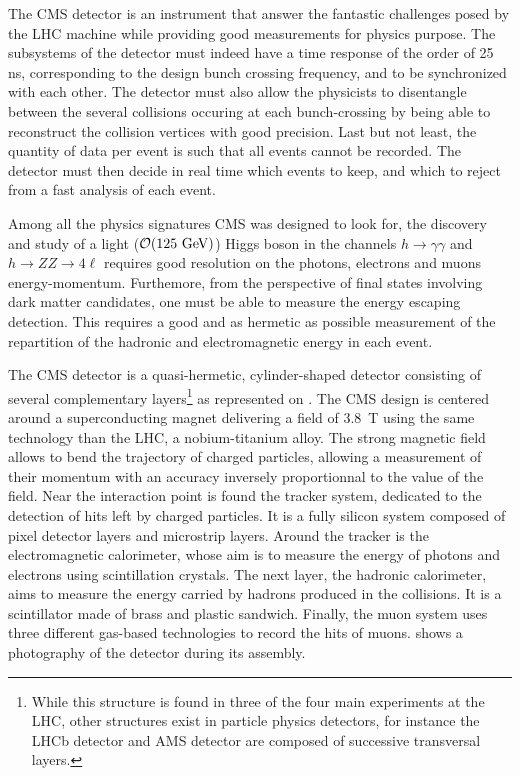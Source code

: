         The CMS detector \cite{CMSdetector} is an instrument that answer the fantastic challenges posed by
        the LHC machine while providing good measurements for physics purpose.
        The subsystems of the detector must indeed have a time response of the order of 25 ns,
        corresponding to the design bunch crossing frequency, and to be synchronized with
        each other. The detector must also allow the physicists to disentangle between the
        several collisions occuring at each bunch-crossing by being able to
        reconstruct the collision vertices with good precision. Last but not least,
        the quantity of data per event is such that all events cannot be recorded. The
        detector must then decide in real time which events to keep, and which to reject
        from a fast analysis of each event.

        Among all the physics signatures CMS was designed to look for, the discovery and study of a
        light ($\mathcal{O}(125 ~\text{GeV})$) Higgs boson in the channels $h\rightarrow\gamma\gamma$
        and $h\rightarrow ZZ \rightarrow 4\ell$ requires good resolution on the photons,
        electrons and muons energy-momentum. Furthemore, from the perspective of final
        states involving dark matter candidates, one must be able to measure
        the energy escaping detection. This requires a good and as hermetic as
        possible measurement of the repartition of the hadronic and electromagnetic energy
        in each event.


        The CMS detector is a quasi-hermetic, cylinder-shaped detector consisting of
        several complementary layers\footnote{While this structure is found in three of the four
        main experiments at the LHC, other structures exist in particle physics detectors,
        for instance the LHCb detector and AMS detector are composed of successive
        transversal layers.}
        as represented on .
        The CMS design is centered around a superconducting magnet delivering a field of
        3.8~T using the same technology than the LHC, a nobium-titanium alloy. The strong
        magnetic field allows to bend the trajectory of charged particles, allowing a
        measurement of their momentum with an accuracy inversely proportionnal to the value
        of the field.
        Near the interaction point is found the tracker system, dedicated to
        the detection of hits left by charged particles. It is a fully silicon system composed of pixel detector
        layers and microstrip layers. Around the tracker is the electromagnetic
        calorimeter, whose aim is to measure the energy of photons and electrons using
        scintillation crystals. The next layer, the hadronic calorimeter, aims to measure
        the energy carried by hadrons produced in the collisions. It is a scintillator made
        of brass and plastic sandwich. Finally, the muon system uses three different gas-based
        technologies to record the hits of muons. 
        shows a photography of the detector during its assembly.

